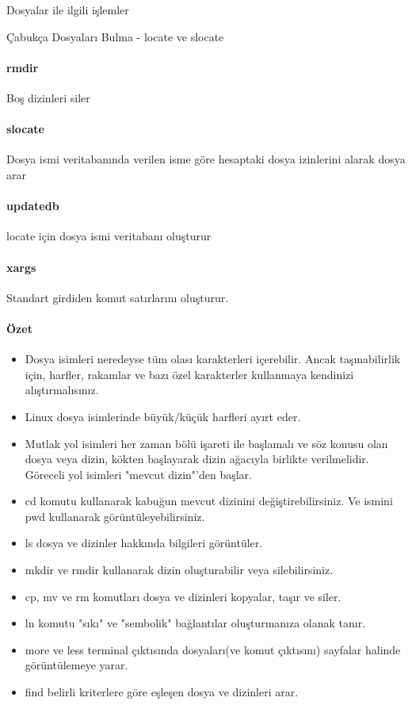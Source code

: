 \documentclass[10pt,a5paper]{book}
\begin{document}
\begin{section}{Dosyalar ile ilgili işlemler}
\begin{subsection}{Çabukça Dosyaları Bulma - locate ve slocate}
\paragraph{rmdir}{	Boş dizinleri siler}
\paragraph{slocate}{	Dosya ismi veritabanında verilen isme göre hesaptaki dosya izinlerini alarak dosya arar}
\paragraph{updatedb}{	locate için dosya ismi veritabanı oluşturur}
\paragraph{xargs}{	Standart girdiden komut satırlarını oluşturur.}

\paragraph{Özet}{
\begin{itemize}
 \item Dosya isimleri neredeyse tüm olası karakterleri içerebilir. Ancak taşınabilirlik için,  harfler, rakamlar ve bazı özel karakterler kullanmaya kendinizi alıştırmalısınız.
 \item Linux dosya isimlerinde büyük/küçük harfleri ayırt eder.
 \item Mutlak yol isimleri her zaman bölü işareti ile başlamalı ve söz konusu olan dosya veya dizin, kökten başlayarak dizin ağacıyla birlikte verilmelidir. Göreceli yol isimleri "mevcut dizin"'den başlar.
 \item cd komutu kullanarak kabuğun mevcut dizinini değiştirebilirsiniz. Ve ismini pwd kullanarak görüntüleyebilirsiniz.
 \item ls dosya ve dizinler hakkında bilgileri görüntüler.
 \item mkdir ve rmdir kullanarak dizin oluşturabilir veya silebilirsiniz.
 \item cp, mv ve rm komutları dosya ve dizinleri kopyalar, taşır ve siler.
 \item ln komutu "sıkı" ve "sembolik" bağlantılar oluşturmanıza olanak tanır.
 \item more ve less terminal çıktısında dosyaları(ve komut çıktısını) sayfalar halinde görüntülemeye yarar.
 \item find belirli kriterlere göre eşleşen dosya ve dizinleri arar.
\end{itemize}}
\end{subsection}
\end{section}
\end{document}
